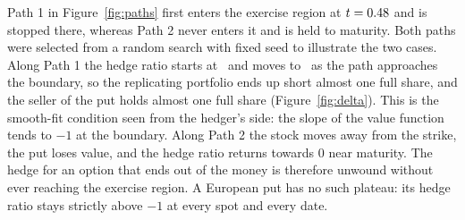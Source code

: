 Path 1 in Figure~\ref{fig:paths} first enters the exercise region at $t=0.48$ and is stopped there, whereas Path 2 never enters it and is held to maturity.
Both paths were selected from a random search with fixed seed to illustrate the two cases.
Along Path 1 the hedge ratio starts at \DeltaStart\ and moves to \DeltaPathOneEnd\ as the path approaches the boundary, so the replicating portfolio ends up short almost one full share, and the seller of the put holds almost one full share (Figure~\ref{fig:delta}).
This is the smooth-fit condition seen from the hedger's side: the slope of the value function tends to $-1$ at the boundary.
Along Path 2 the stock moves away from the strike, the put loses value, and the hedge ratio returns towards $0$ near maturity.
The hedge for an option that ends out of the money is therefore unwound without ever reaching the exercise region.
A European put has no such plateau: its hedge ratio stays strictly above $-1$ at every spot and every date.

